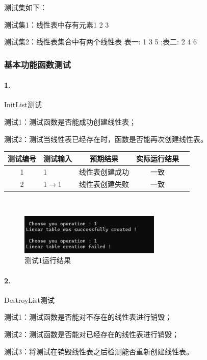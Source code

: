 \documentclass[supercite]{Experimental_Report}
\theoremstyle{definition}
\begin{document}
测试集如下：

测试集1：线性表中存有元素1 2 3

测试集2：线性表集合中有两个线性表 表一: 1 3 5 ;表二: 2 4 6 

\setcounter{paragraph}{0}

\subsubsection{基本功能函数测试}

\paragraph{ 1.}InitList测试

测试1：测试函数是否能成功创建线性表；

测试2：测试当线性表已经存在时，函数是否能再次创建线性表。

\vspace{0.5em}

\begin{tabular}{|c|l|c|c|c|}
	\hline
	测试编号 & 测试输入 & 预期结果 & 实际运行结果 \\
	\hline
	1 & 1 & 线性表创建成功 & 一致 \\
	\hline
	2 & 1$\rightarrow$1 & 线性表创建失败 & 一致 \\
	\hline
\end{tabular}

~\

 \begin{figure}[H]
 	\centering
 	\includegraphics[width=0.6\textwidth]{images/线性表测试1.png}
 	\caption{测试1运行结果}
 	\label{txlab}
 \end{figure}


\paragraph{ 2.}DestroyList测试

测试1：测试函数是否能对不存在的线性表进行销毁；

测试2：测试函数是否能对已经存在的线性表进行销毁；

测试3：将测试在销毁线性表之后检测能否重新创建线性表。

\vspace{0.5em}
\end{document}
